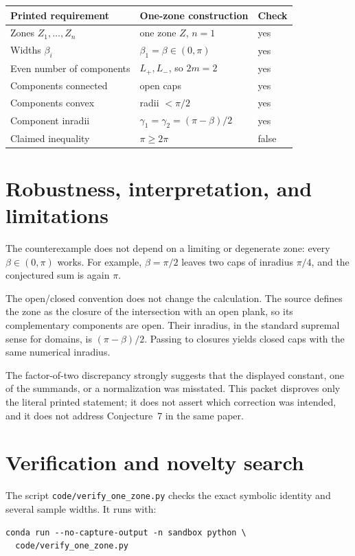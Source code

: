 \documentclass[11pt]{article}
\begin{document}
\begin{center}
\begin{tabular}{@{}lll@{}}
\toprule
Printed requirement & One-zone construction & Check \\
\midrule
Zones $Z_1,\ldots,Z_n$ & one zone $Z$, $n=1$ & yes \\
Widths $\beta_i$ & $\beta_1=\beta\in(0,\pi)$ & yes \\
Even number of components & $L_+,L_-$, so $2m=2$ & yes \\
Components connected & open caps & yes \\
Components convex & radii $<\pi/2$ & yes \\
Component inradii & $\gamma_1=\gamma_2=(\pi-\beta)/2$ & yes \\
Claimed inequality & $\pi\ge 2\pi$ & false \\
\bottomrule
\end{tabular}
\end{center}

\section{Robustness, interpretation, and limitations}

The counterexample does not depend on a limiting or degenerate zone: every
$\beta\in(0,\pi)$ works.  For example, $\beta=\pi/2$ leaves two caps of
inradius $\pi/4$, and the conjectured sum is again $\pi$.

The open/closed convention does not change the calculation.  The source
defines the zone as the closure of the intersection with an open plank, so
its complementary components are open.  Their inradius, in the standard
supremal sense for domains, is $(\pi-\beta)/2$.  Passing to closures yields
closed caps with the same numerical inradius.

The factor-of-two discrepancy strongly suggests that the displayed
constant, one of the summands, or a normalization was misstated.  This
packet disproves only the literal printed statement; it does not assert
which correction was intended, and it does not address Conjecture~7 in the
same paper.

\clearpage
\section{Verification and novelty search}

The script \texttt{code/verify\_one\_zone.py} checks the exact symbolic
identity and several sample widths.  It runs with:
\begin{verbatim}
conda run --no-capture-output -n sandbox python \
  code/verify_one_zone.py
\end{verbatim}
\end{document}
